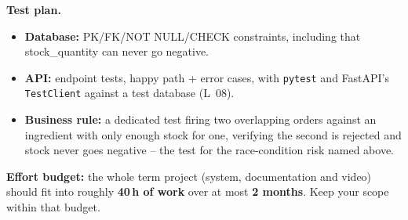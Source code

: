 \documentclass[11pt,a4paper]{article}
\begin{document}
\textbf{Test plan.}
\begin{itemize}[topsep=2pt]
  \item \textbf{Database:} PK/FK/NOT NULL/CHECK constraints, including
        that stock\_quantity can never go negative.
  \item \textbf{API:} endpoint tests, happy path + error cases, with
        \texttt{pytest} and FastAPI's \texttt{TestClient} against a test
        database (L~08).
  \item \textbf{Business rule:} a dedicated test firing two overlapping
        orders against an ingredient with only enough stock for one,
        verifying the second is rejected and stock never goes negative --
        the test for the race-condition risk named above.
\end{itemize}

\vspace{1em}
\begin{infobox}
\textbf{Effort budget:} the whole term project (system, documentation and video)
should fit into roughly \textbf{40\,h of work} over at most \textbf{2 months}.
Keep your scope within that budget.
\end{infobox}
\end{document}
